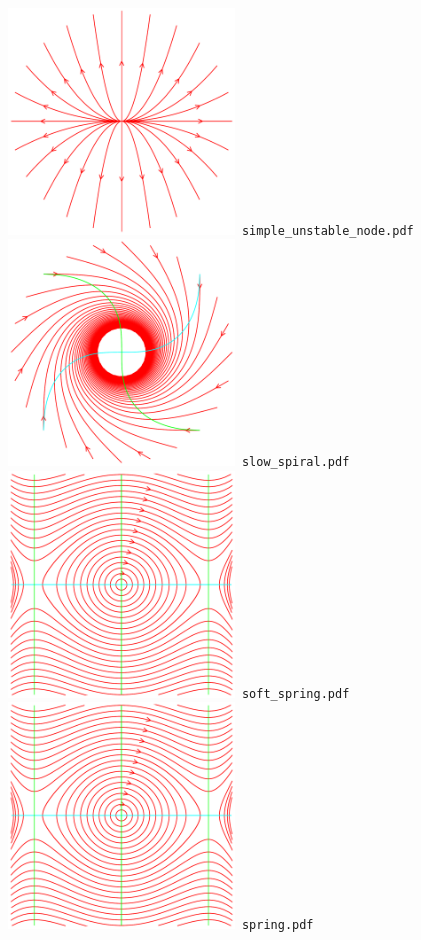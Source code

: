 \documentclass[a4paper]{amsart}
\begin{document}
\includegraphics[width=6cm]{simple_unstable_node.pdf}\verb+ simple_unstable_node.pdf+\\
\includegraphics[width=6cm]{slow_spiral.pdf}\verb+ slow_spiral.pdf+\\
\includegraphics[width=6cm]{soft_spring.pdf}\verb+ soft_spring.pdf+\\
\includegraphics[width=6cm]{spring.pdf}\verb+ spring.pdf+\\
\end{document}
